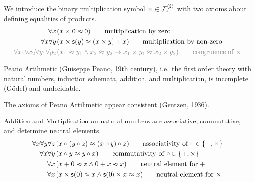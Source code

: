 \begin{definition}
	[Multiplikation]
	\label{tab:addition:axioms}
	We introduce the binary multiplication symbol $\times\in\mcFfn[2]$
	with two axioms about defining equalities of products.
	\begin{align*}
	\forall x\,
	&(x\times 0 \mEQ 0) 
	\tag*{multiplication by zero}\\
	\forall x\forall y\,
	&(x\times\msucc(y) \mEQ (x\times y) + x)
	\tag*{multiplication by non-zero}
	\\
	\colG\forall x_1\forall x_2\forall y_1\forall y_2\,
	&\colG (x_1\mEQ y_1\land x_2\mEQ y_2 \limp x_1\times y_1\mEQ x_2 \times y_2)
	\tag*{congruence of $\times$}
	\end{align*}
\end{definition}

\begin{theorem}Peano Artihmetic (Guiseppe Peano, 19th century), 
	i.e.~the first order theory with natural numbers, induction schemata, addition, and multiplication, is incomplete (Gödel) and undecidable. 
\end{theorem}

\begin{theorem}
	The axioms of Peano Artihmetic appear consistent (Gentzen, 1936).
\end{theorem}

\begin{lemma}[ACN]\label{lem:acn}
	Addition and Multiplication on natural numbers are associative, commutative, 
	and determine neutral elements.
	\begin{align*}
	\forall x\forall y\forall z\,&(x\circ(y\circ z) \mEQ (x\circ y)\circ z) 
	\tag*{associativity of $\circ\in\{+,\times\}$}
	\\
	\forall x\forall y\,&(x\circ y \mEQ y\circ x)
	\tag*{commutativity of $\circ\in\{+,\times\}$}
	\\
	\forall x\,&(x + 0\mEQ x \land 0 + x \mEQ x )
	\tag*{neutral element for $+$}
	\\
	\forall x\,&(x \times \msucc(0)\mEQ x \land \msucc(0) \times x \mEQ x )
	\tag*{neutral element for $\times$}
	\end{align*}
\end{lemma}











